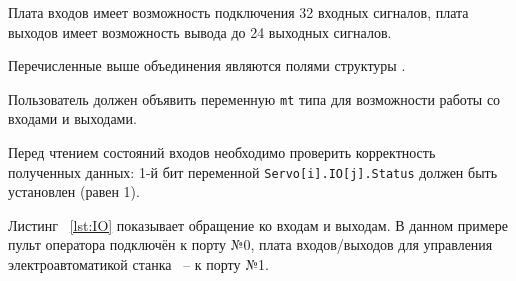 Плата входов имеет возможность подключения 32 входных сигналов, плата выходов имеет возможность вывода до 24 выходных сигналов.

Перечисленные выше объединения являются полями структуры .

Пользователь должен объявить переменную \texttt{mt} типа  для возможности работы со входами и выходами.


Перед чтением состояний входов необходимо проверить корректность полученных данных: 1-й бит переменной \texttt{Servo[i].IO[j].Status} должен быть установлен (равен 1).

Листинг ~\ref{lst:IO} показывает обращение ко входам и выходам. В данном примере пульт оператора подключён к порту №0, плата входов/выходов для управления электроавтоматикой станка ~-- к порту №1. \killoverfullbefore \BL


